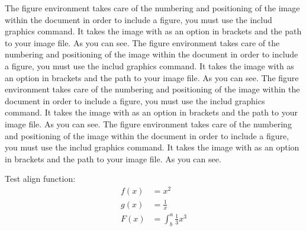 \documentclass[18pt]{article}
\begin{document}
The figure environment takes care of the numbering and positioning of the image within the document in order to include a figure, you must use the includ graphics command. It takes the image with as an option in brackets and the path to your image file.  As you can see.
The figure environment takes care of the numbering and positioning of the image within the document in order to include a figure, you must use the includ graphics command. It takes the image with as an option in brackets and the path to your image file.  As you can see.
The figure environment takes care of the numbering and positioning of the image within the document in order to include a figure, you must use the includ graphics command. It takes the image with as an option in brackets and the path to your image file.  As you can see.
The figure environment takes care of the numbering and positioning of the image within the document in order to include a figure, you must use the includ graphics command. It takes the image with as an option in brackets and the path to your image file.  As you can see.

Test align function: 
\begin{align*}
f(x) &= x^2\\
g(x) &= \frac{1}{x}\\
F(x) &= \int^a_b \frac{1}{3}x^3
\end{align*}
\end{document}
